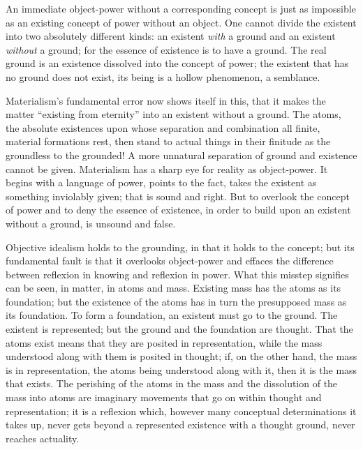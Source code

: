 \documentclass[12pt,a4paper]{book}
\begin{document}
An immediate object-power without a corresponding concept is just as impossible as
an existing concept of power without an object. One cannot divide the existent into
two absolutely different kinds: an existent \emph{with} a ground and an existent
\emph{without} a ground; for the essence of existence is to have a ground. The real
ground is an existence dissolved into the concept of power; the existent that has no
ground does not exist, its being is a hollow phenomenon, a semblance.

Materialism's fundamental error now shows itself in this, that it makes the matter
``existing from eternity'' into an existent without a ground. The atoms, the absolute
existences upon whose separation and combination all finite, material formations
rest, then stand to actual things in their finitude as the groundless to the
grounded! A more unnatural separation of ground and existence cannot be given.
Materialism has a sharp eye for reality as object-power. It begins with a language of
power, points to the fact, takes the existent as something inviolably given; that is
sound and right. But to overlook the concept of power and to deny the essence of
existence, in order to build upon an existent without a ground, is unsound and false.

Objective idealism holds to the grounding, in that it holds to the concept; but its
fundamental fault is that it overlooks object-power and effaces the difference between
reflexion in knowing and reflexion in power. What this misstep signifies can be seen,
in matter, in atoms and mass. Existing mass has the atoms as its foundation; but the
existence of the atoms has in turn the presupposed mass as its foundation. To form a
foundation, an existent must go to the ground. The existent is represented; but the
ground and the foundation are thought. That the atoms exist means that they are
posited in representation, while the mass understood along with them is posited in
thought; if, on the other hand, the mass is in representation, the atoms being
understood along with it, then it is the mass that exists. The perishing of the atoms
in the mass and the dissolution of the mass into atoms are imaginary movements that go
on within thought and representation; it is a reflexion which, however many conceptual
determinations it takes up, never gets beyond a
represented existence with a thought ground, never reaches actuality.
\end{document}
